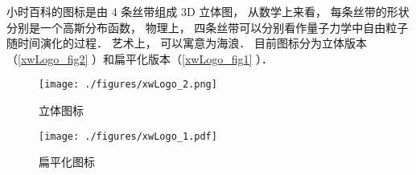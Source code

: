 
\begin{issues}
\issueDraft
{}
\end{issues}

小时百科的图标是由 4 条丝带组成 3D 立体图， 从数学上来看， 每条丝带的形状分别是一个高斯分布函数， 物理上， 四条丝带可以分别看作量子力学中自由粒子随时间演化的过程． 艺术上， 可以寓意为海浪． 目前图标分为立体版本（\autoref{xwLogo_fig2} ）和扁平化版本（\autoref{xwLogo_fig1} ）．

\begin{figure}[ht]
\centering
\texttt{[image: ./figures/xwLogo\_2.png]}
\caption{立体图标} \label{xwLogo_fig2}
\end{figure}

\begin{figure}[ht]
\centering
\texttt{[image: ./figures/xwLogo\_1.pdf]}
\caption{扁平化图标} \label{xwLogo_fig1}
\end{figure}

